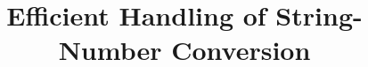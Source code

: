 \documentclass[sigplan,review,anonymous]{acmart}\settopmatter{printfolios=true,printccs=false,printacmref=false}
\title{Efficient Handling of String-Number Conversion}
\author{}
\begin{document}
\newcommand{\hide}[1]{}
\newcommand{\tool}{{\textsf{Z3-PFA}}}
\newcommand{\dr}{\mathcal{R}}
\newcommand{\nat}{\mathbb{N}}
\newcommand{\integers}{\mathbb{Z}}
\newcommand{\todo}[1]{{\color{blue}TODO: #1}}
\newcommand{\lh}[1]{{\color{orange}Lukas: #1}}
\newcommand{\changed}[1]{{\color{orange}#1}}
\newcommand{\yfc}[1]{{\color{blue}YFC: #1}}
\newcommand{\petr}[1]{{\color{pink}Petr: #1}}
\newcommand{\chatAt}[2]{\mbox{\textsf{charAt}($#1$, $#2$)}}
\newcommand{\ite}[3]{\mbox{\textsf{ite}($#1$, $#2$, $#3$)}}
\newcommand{\sti}[1]{\mbox{\textsf{toNum}($#1$)}}
\newcommand{\its}[1]{\mbox{\textsf{toStr}($#1$)}}
\newcommand{\varn}{\mbox{$Z$}}
\newcommand{\vars}{\mbox{$X$}}
\newcommand{\cvars}{\mbox{$\mathbb{V}_{\Sigma_\epsilon}$}}
\newcommand{\pvars}{\mbox{$\mathbb{V}_{\sharp}$}}
\newcommand{\cvarone}{V}
\newcommand{\cvartwo}{V'}
\newcommand{\cvar}{V}
\newcommand{\modelsof}[1]{[\![#1]\!]}
\newcommand{\true}{\mbox{$\mathsf{true}$}}
\newcommand{\false}{\mbox{$\mathsf{false}$}}
\newcommand{\enc}[1]{[\![#1]\!]}
\newcommand{\parikhof}[1]{\mathbb{P}{(#1)}}
\newcommand{\parikhwof}[2]{|#1|_{#2}}
\newcommand{\semof}[1]{\modelsof{#1}}
\newcommand{\decode}[1]{\mathit{decode_{#1}}}
\newcommand{\parikhfof}[1]{\Phi_{\mathbb{P}}(#1)} %
\newcommand{\pim}{I_{\#}}
\newcommand{\syncop}{\times}
\newcommand{\syncof}[2]{#1 \syncop #2}
\newcommand{\syncfof}[2]{\Psi_{\syncof {#1} {#2}}}
\newcommand{\syncT}{T_\syncop}
\newcommand{\pvarsof}[1]{\#{#1}}
\newcommand{\pvar}{\pvarsof V}
\newcommand{\pvarone}{\pvarsof V}
\newcommand{\pvartwo}{\pvarsof {V'}}
\newcommand{\defeq}{::=}
\newcommand{\encode}[1]{\mathit{encode}_{#1}}
\newcommand{\eqwrt}[1]{=_{#1}}
\newcommand{\iequiv}{\equiv}
\newcommand{\restrict}[2]{#1_{#2}}
\newcommand{\underf}[2]{\mathit{flatten}_#1(#2)}
\newcommand{\paf}{\psi}

\newcommand\pa{P}
\newcommand{\leftA}{\pa^{\mathit{left}}}
\newcommand{\rightA}{\pa^{\mathit{right}}}
\newcommand{\leftV}{V^{\mathit{left}}}
\newcommand{\rightV}{V^{\mathit{right}}}
\newcommand\renvars{V_\dr^\mathsf{ver}}
\end{document}
